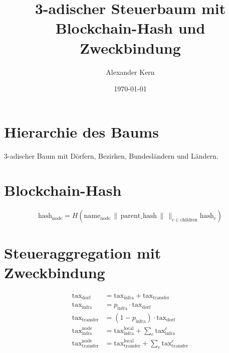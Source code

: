 \documentclass[a4paper,12pt]{article}
\title{3-adischer Steuerbaum mit Blockchain-Hash und Zweckbindung}
\author{Alexander Kern}
\date{\today}
\begin{document}
\maketitle

\section{Hierarchie des Baums}
3-adischer Baum mit Dörfern, Bezirken, Bundesländern und Ländern.

\begin{center}
\end{center}

\section{Blockchain-Hash}
\[
\text{hash}_\text{node} = H(\text{name}_\text{node} \, \| \, \text{parent\_hash} \, \| \, \big\|_{c \in \text{children}} \text{hash}_c)
\]

\section{Steueraggregation mit Zweckbindung}
\begin{align*}
\text{tax}_\text{dorf} &= \text{tax}_\text{infra} + \text{tax}_\text{transfer} \\
\text{tax}_\text{infra} &= p_\text{infra} \cdot \text{tax}_\text{dorf} \\
\text{tax}_\text{transfer} &= (1 - p_\text{infra}) \cdot \text{tax}_\text{dorf} \\
\text{tax}_\text{infra}^{\text{node}} &= \text{tax}_\text{infra}^{\text{local}} + \sum_{c} \text{tax}_\text{infra}^c \\
\text{tax}_\text{transfer}^{\text{node}} &= \text{tax}_\text{transfer}^{\text{local}} + \sum_{c} \text{tax}_\text{transfer}^c
\end{align*}
\end{document}
